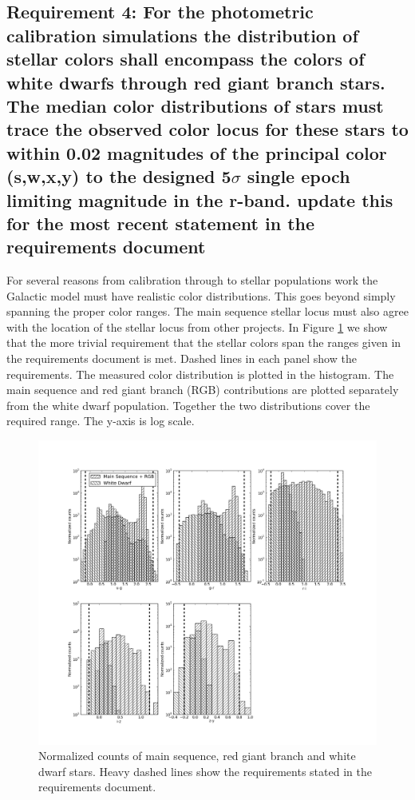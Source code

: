 \documentclass[]{article}
\begin{document}
{\subsection{Requirement 4: For the photometric calibration simulations
the distribution of stellar colors shall encompass the colors of white dwarfs through red giant branch stars.
The median color distributions of stars must trace the observed color locus for these stars to within 0.02 magnitudes
of the principal color (s,w,x,y) to the designed 5$\sigma$ single epoch limiting magnitude in the r-band.
{\bf update this for the most recent statement in the requirements document}}
For several reasons from calibration through to stellar populations work the Galactic model must have realistic color distributions.
This goes beyond simply spanning the proper color ranges.  The main sequence stellar locus must also agree with the location of the
stellar locus from other projects.  In Figure \ref{fig:starcolorspan} we show that the more trivial requirement that the stellar
colors span the ranges given in the requirements document is met.  Dashed lines in each panel show the requirements.  The measured
color distribution is plotted in the histogram.  The main sequence and red giant branch (RGB) contributions are plotted separately from
the white dwarf population.  Together the two distributions cover the required range.  The y-axis is log scale.
\begin{figure}[H]
\centering
\includegraphics[width=5in]{validation_figures/star_lsst_color_hist.png}
\caption{Normalized counts of main sequence, red giant branch and white dwarf stars.  Heavy dashed lines show the requirements stated in the requirements document.\label{fig:starcolorspan}}
\end{figure}

}
\end{document}
